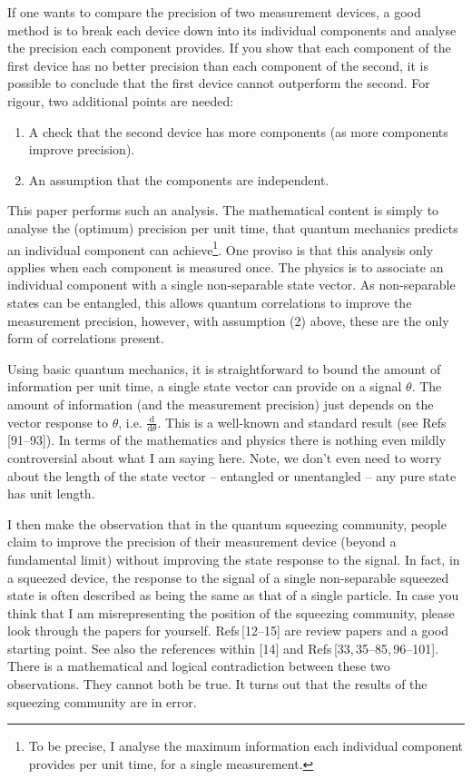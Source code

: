 \documentclass[reqno]{amsart}
\begin{document}
If one wants to compare the precision of two measurement devices, a good method is to break each device down into its individual components and analyse the precision each component provides. If you show that each component of the first device has no better precision than each component of the second, it is possible to conclude that the first device cannot outperform the second. For rigour, two additional points are needed:
\begin{enumerate}
\item A check that the second device has more components (as more components improve precision).
\item An assumption that the components are independent. 
\end{enumerate}

This paper performs such an analysis. The mathematical content is simply to analyse the (optimum) precision per unit time, that quantum mechanics predicts an individual component can achieve\footnote{To be precise, I analyse the maximum information each individual component provides per unit time, for a single measurement.}. One proviso is that this analysis only applies when each component is measured once. The physics is to associate an individual component with a single non-separable state vector. As non-separable states can be entangled, this allows quantum correlations to improve the measurement precision, however, with assumption (2) above, these are the only form of correlations present. 

Using basic quantum mechanics, it is straightforward to bound the amount of information per unit time, a single state vector can provide on a signal $\theta$. The amount of information (and the measurement precision) just depends on the vector response to $\theta$, i.e. $\frac{\mathrm{d}}{\mathrm{d}\theta}$. This is a well-known and standard result (see Refs\,[\textcolor{blue!50!black}{91}--\textcolor{blue!50!black}{93}]). In terms of the mathematics and physics there is nothing even mildly controversial about what I am saying here. Note, we don't even need to worry about the length of the state vector -- entangled or unentangled -- any pure state has unit length.

I then make the observation that in the quantum squeezing community, people claim to improve the precision of their measurement device (beyond a fundamental limit) without improving the state response to the signal. In fact, in a squeezed device, the response to the signal of a single non-separable squeezed state is often described as being the same as that of a single particle. In case you think that I am misrepresenting the position of the squeezing community, please look through the papers for yourself. Refs\,[\textcolor{blue!50!black}{12}--\textcolor{blue!50!black}{15}] are review papers and a good starting point. See also the references within [\textcolor{blue!50!black}{14}] and Refs\,[\textcolor{blue!50!black}{33},\,\textcolor{blue!50!black}{35}--\textcolor{blue!50!black}{85},\,\textcolor{blue!50!black}{96}--\textcolor{blue!50!black}{101}]. There is a mathematical and logical contradiction between these two observations. They cannot both be true. It turns out that the results of the squeezing community are in error.
\end{document}
